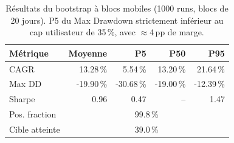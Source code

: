 \begin{table}[H]
\centering
\caption{Résultats du bootstrap à blocs mobiles (1000 runs, blocs de 20 jours). P5 du Max Drawdown strictement inférieur au cap utilisateur de 35\,\%, avec $\approx$4\,pp de marge.}
\label{tab:bootstrap_percentiles}
\begin{tabular}{lrrrr}
\toprule
Métrique & Moyenne & P5 & P50 & P95 \\
\midrule
CAGR & 13.28\,\% & 5.54\,\% & 13.20\,\% & 21.64\,\% \\
Max DD & -19.90\,\% & -30.68\,\% & -19.00\,\% & -12.39\,\% \\
Sharpe & 0.96 & 0.47 & -- & 1.47 \\
Pos. fraction & \multicolumn{4}{c}{99.8\,\%} \\
Cible atteinte & \multicolumn{4}{c}{39.0\,\%} \\
\bottomrule
\end{tabular}
\end{table}
